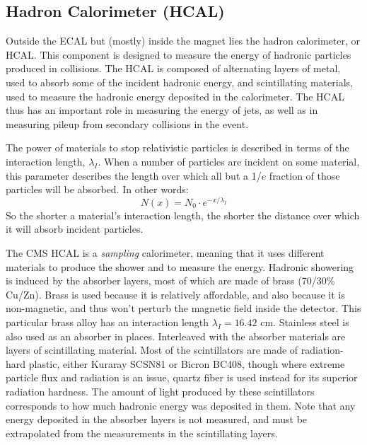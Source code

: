 \subsection{Hadron Calorimeter (HCAL)}
\label{ssec:cms:components:hcal}

Outside the ECAL but (mostly) inside the magnet lies the hadron
calorimeter, or HCAL. This component is designed to measure the energy
of hadronic particles produced in collisions. The HCAL is composed of
alternating layers of metal, used to absorb some of the incident
hadronic energy, and scintillating materials, used to measure the
hadronic energy deposited in the calorimeter. The HCAL thus has an
important role in measuring the energy of jets, as well as in
measuring pileup from secondary collisions in the event.

The power of materials to stop relativistic particles is described in
terms of the interaction length, $\lambda_I$. When a number of
particles are incident on some material, this parameter describes
the length over which all but a 1/$e$ fraction of those particles will
be absorbed. In other words:
\begin{equation}
\label{eq:cms:hcal:intlength}
N(x) = N_0 \cdot e^{-x/\lambda_I}
\end{equation}
So the shorter a material's interaction length, the shorter the
distance over which it will absorb incident particles.

The CMS HCAL is a \emph{sampling} calorimeter, meaning that it uses
different materials to produce the shower and to measure the
energy. Hadronic showering is induced by the absorber layers, most of
which are made of brass (70/30\% Cu/Zn). Brass
is used because it is relatively affordable, and also because it is
non-magnetic, and thus won't perturb the magnetic field inside the
detector. This particular brass alloy has an interaction length
$\lambda_I = 16.42$ cm. Stainless steel is also used as an absorber in places.
Interleaved with the absorber materials are layers of
scintillating material. Most of the scintillators are made of
radiation-hard plastic, either Kuraray SCSN81 or Bicron BC408, though
where extreme particle flux and radiation is an issue, quartz fiber is
used instead for its superior radiation hardness. The amount of light
produced by these scintillators corresponds to how much hadronic
energy was deposited in them. Note that any energy deposited in the
absorber layers is not measured, and must be extrapolated from the
measurements in the scintillating layers.

